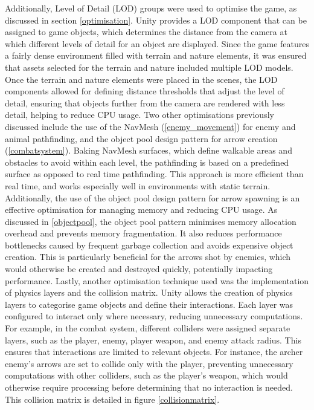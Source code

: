 \documentclass[10pt]{final_report}
\begin{document}
Additionally, Level of Detail (LOD) groups were used to optimise the game, as discussed in section \ref{optimisation}. Unity provides a LOD component that can be assigned to game objects, which determines the distance from the camera at which different levels of detail for an object are displayed. Since the game features a fairly dense environment filled with terrain and nature elements, it was ensured that assets selected for the terrain and nature included multiple LOD models. Once the terrain and nature elements were placed in the scenes, the LOD components allowed for defining distance thresholds that adjust the level of detail, ensuring that objects further from the camera are rendered with less detail, helping to reduce CPU usage.
\newline
Two other optimisations previously discussed include the use of the NavMesh (\ref{enemy_movement}) for enemy and animal pathfinding, and the object pool design pattern for arrow creation (\ref{combatsystem}). Baking NavMesh surfaces, which define walkable areas and obstacles to avoid within each level, the pathfinding is based on a predefined surface as opposed to real time pathfinding. This approach is more efficient than real time, and works especially well in environments with static terrain. Additionally, the use of the object pool design pattern for arrow spawning is an effective optimisation for managing memory and reducing CPU usage. As discussed in \ref{objectpool}, the object pool pattern minimises memory allocation overhead and prevents memory fragmentation. It also reduces performance bottlenecks caused by frequent garbage collection and avoids expensive object creation. This is particularly beneficial for the arrows shot by enemies, which would otherwise be created and destroyed quickly, potentially impacting performance.
\newline 
Lastly, another optimisation technique used was the implementation of physics layers and the collision matrix. Unity allows the creation of physics layers to categorise game objects and define their interactions. Each layer was configured to interact only where necessary, reducing unnecessary computations. For example, in the combat system, different colliders were assigned separate layers, such as the player, enemy, player weapon, and enemy attack radius. This ensures that interactions are limited to relevant objects. For instance, the archer enemy’s arrows are set to collide only with the player, preventing unnecessary computations with other colliders, such as the player’s weapon, which would otherwise require processing before determining that no interaction is needed. This collision matrix is detailed in figure \ref{collisionmatrix}.
\end{document}
